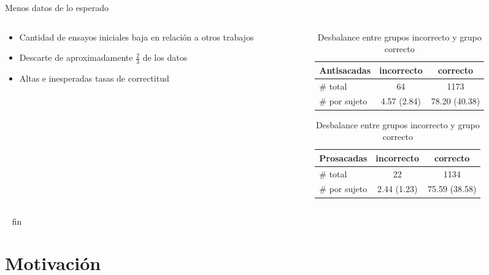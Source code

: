 \documentclass[aspectratio=169]{beamer}
\begin{document}
\begin{frame}{Menos datos de lo esperado}
  \begin{columns}
    \begin{column}{0.4\textwidth}
      \begin{itemize}
        \item Cantidad de ensayos iniciales baja en relación a otros trabajos
        \item Descarte de aproximadamente $\frac{2}{3}$ de los datos
        \item Altas e inesperadas tasas de correctitud
      \end{itemize}
    \end{column}

    \begin{column}{0.6\textwidth}
      \begin{table}
        \centering

        \begin{tabular}{ l | c | c }
          Antisacadas   & incorrecto  & correcto \\
          \hline
          \# total      & 64          & 1173 \\
          \hline
          \# por sujeto & 4.57 (2.84) & 78.20 (40.38)
        \end{tabular}

        \vspace{0.3cm}

        \begin{tabular}{ l | c | c }
          Prosacadas    & incorrecto  & correcto \\
          \hline
          \# total      & 22          & 1134 \\
          \hline
          \# por sujeto & 2.44 (1.23) & 75.59 (38.58)
        \end{tabular}

        \caption{Desbalance entre grupos incorrecto y grupo correcto}
      \end{table}
    \end{column}
  \end{columns}
\end{frame}

\begin{frame}{~}
  fin
\end{frame}

\section{Motivación}
\end{document}
